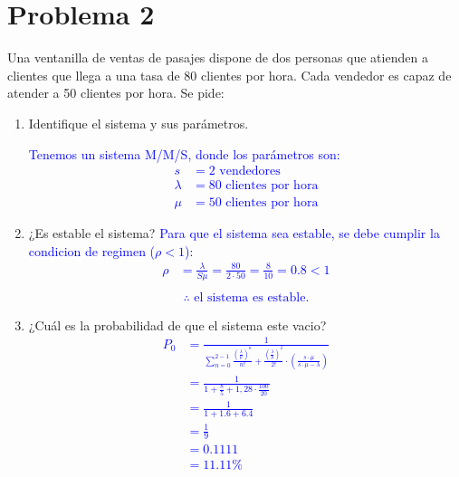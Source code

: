 \documentclass{templateNote}
\newcommand{\newparagraph}{\par\vspace{\baselineskip}\noindent}
\begin{document}
\newpage
\section{Problema 2}
Una ventanilla de ventas de pasajes dispone de dos personas que atienden a clientes que llega a una tasa de 80 clientes por hora. Cada vendedor es capaz de atender a 50 clientes por hora. Se pide:
\begin{enumerate}
    \renewcommand{\labelenumi}{\alph{enumi})}
    \item Identifique el sistema y sus parámetros.
    \newparagraph
    \textcolor{blue}{
        Tenemos un sistema M/M/S, donde los parámetros son:
        \begin{align*}
            s &= 2 \text{ vendedores} \\
            \lambda &= 80 \text{ clientes por hora} \\
            \mu &= 50 \text{ clientes por hora}
        \end{align*}
    }

    \item ¿Es estable el sistema? \newline
    \textcolor{blue}{
        Para que el sistema sea estable, se debe cumplir la condicion de regimen ($\rho < 1$):
        \begin{align*}
            \rho &= \frac{\lambda}{S\mu} = \frac{80}{2 \cdot 50} = \frac{8}{10} = 0.8 < 1 \\
        \end{align*}
        \begin{align*}
            \therefore \text{ el sistema es estable.}
        \end{align*}      
    }

    \item ¿Cuál es la probabilidad de que el sistema este vacio?
    \textcolor{blue}{
        \begin{align*}
            P_0 &= \frac{1}{\displaystyle\sum_{n=0}^{2-1} \frac{\left(\frac{\lambda}{\mu}\right)^n}{n!} + \frac{\left(\frac{\lambda}{\mu}\right)^2}{2!} \cdot \left(\frac{s \cdot \mu}{ s \cdot \mu - \lambda}\right)} \\
            &= \frac{1}{1 + \frac{8}{5} + 1,28 \cdot \frac{100}{20}} \\
            &= \frac{1}{1 + 1.6 + 6.4} \\
            &= \frac{1}{9} \\
            &= 0.1111 \\
            &= 11.11\%
        \end{align*}
    }
    

\end{enumerate}
\end{document}
